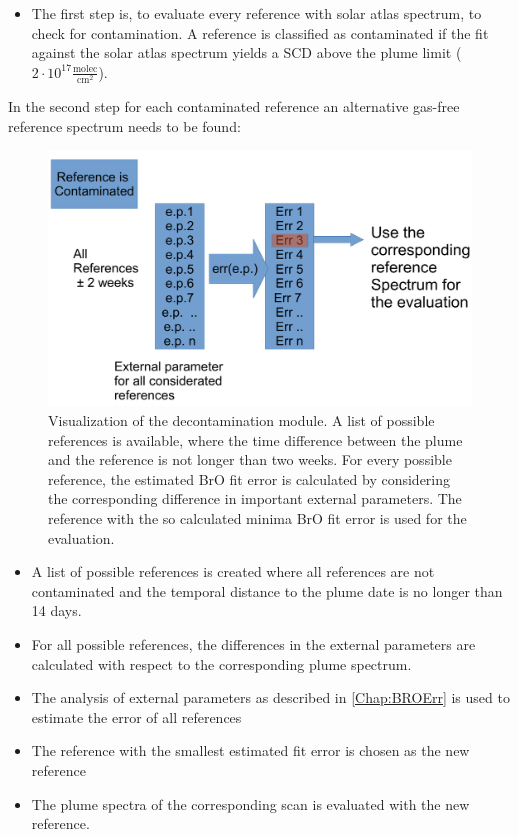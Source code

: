 \documentclass  [
  paper    = a4,
  BCOR     = 10mm,
  twoside,
  fontsize = 12pt,
  fleqn,
  toc      = bibnumbered,
  toc      = listofnumbered,
  numbers  = noendperiod,
  headings = normal,
  listof   = leveldown,
  version  = 3.03
]                                       {scrreprt}
\begin{document}
\begin{itemize}
	\item The first step is, to evaluate every reference with solar atlas spectrum, to check for contamination. A reference is classified as contaminated if the fit against the solar atlas spectrum yields a  SCD above the plume limit ($2\cdot10^{17}\frac{\text{molec}}{\text{cm}^2}$).
\end{itemize}
In the second step for each contaminated reference an alternative gas-free reference spectrum needs to be found:
\begin{figure}
	\centering
	\includegraphics[width=0.7\linewidth]{Bilder/Cont}
	\caption[Visualization of the decontamination module.]{Visualization of the decontamination module. A list of possible references is available, where the time difference between the plume and the reference is not longer than two weeks. For every possible reference, the estimated BrO fit error is calculated by considering the corresponding difference in important external parameters. The reference with the so calculated minima BrO fit error is used for the evaluation.}
	\label{fig:Cont}
\end{figure}

\begin{itemize}
	\item A list of possible references is created where all references are not contaminated and the temporal distance to the plume date is no longer than 14 days.
	\item For all possible references, the differences in the external parameters are calculated with respect to the corresponding plume spectrum.
	\item The analysis of external parameters as described in \cref{Chap:BROErr} is used to estimate the  error of all references
	\item The reference with the smallest estimated  fit error is chosen as the new reference
	\item  The plume spectra of the corresponding scan is evaluated with the new reference.
\end{itemize}
\end{document}
